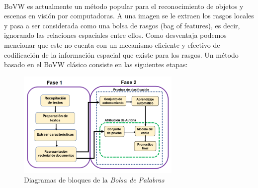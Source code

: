 \documentclass{article}
\begin{document}
\paragraph{}
BoVW es actualmente un método popular para el reconocimiento de objetos y escenas en visión por computadoras. A una imagen se le extraen los rasgos locales y pasa a ser considerada como una bolsa de rasgos (bag of features), es decir, ignorando las relaciones espaciales entre ellos. Como desventaja podemos mencionar que este no cuenta con un mecanismo eficiente y efectivo de codificación de la información espacial que existe para los rasgos. Un método basado en el BoVW clásico consiste en las siguientes etapas:

\begin{figure}[h!]
	\centering
	\includegraphics[width=0.7\textwidth]{img/diagrama_bloques.png}
	\caption{Diagramas de bloques de la \textit{Bolsa de Palabras}}
	\label{fig:diagrama_bloques}
\end{figure}
\end{document}
